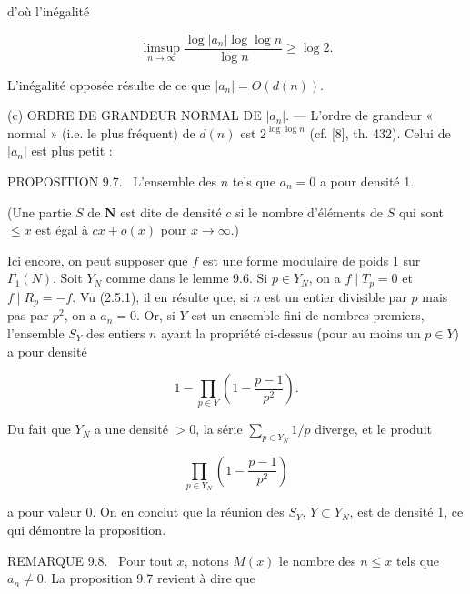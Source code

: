 \documentclass[10pt,oneside]{article}
\begin{document}
d'où l'inégalité\par

\begin{equation*}
\limsup_{n\to\infty}\frac{\log|a_n|\log\log n}{\log n}\geq\log2.
\end{equation*}

L'inégalité opposée résulte de ce que \(|a_n|=O(d(n))\).\par

(c) ORDRE DE GRANDEUR NORMAL DE \(|a_n|\). — L'ordre de grandeur « normal » (i.e. le plus fréquent) de \(d(n)\) est \(2^{\log\log n}\) (cf. [8], th. 432). Celui de \(|a_n|\) est plus petit :\par

\noindent\textsc{PROPOSITION 9.7.} \textemdash\ L'ensemble des \(n\) tels que \(a_n=0\) a pour densité 1.\par

(Une partie \(S\) de \(\mathbf N\) est dite de densité \(c\) si le nombre d'éléments de \(S\) qui sont \(\leq x\) est égal à \(cx+o(x)\) pour \(x\longrightarrow\infty\).)\par

Ici encore, on peut supposer que \(f\) est une forme modulaire de poids 1 sur \(\Gamma_1(N)\). Soit \(Y_N\) comme dans le lemme 9.6. Si \(p\in Y_N\), on a \(f\mid T_p=0\) et \(f\mid R_p=-f\). Vu (2.5.1), il en résulte que, si \(n\) est un entier divisible par \(p\) mais pas par \(p^2\), on a \(a_n=0\). Or, si \(Y\) est un ensemble fini de nombres premiers, l'ensemble \(S_Y\) des entiers \(n\) ayant la propriété ci-dessus (pour au moins un \(p\in Y\)) a pour densité\par

\begin{equation*}
1-\prod_{p\in Y}\left(1-\frac{p-1}{p^2}\right).
\end{equation*}

Du fait que \(Y_N\) a une densité \(>0\), la série \(\sum_{p\in Y_N}1/p\) diverge, et le produit\par

\begin{equation*}
\prod_{p\in Y_N}\left(1-\frac{p-1}{p^2}\right)
\end{equation*}

a pour valeur 0. On en conclut que la réunion des \(S_Y\), \(Y\subset Y_N\), est de densité 1, ce qui démontre la proposition.\par

\noindent\textsc{REMARQUE 9.8.} \textemdash\ Pour tout \(x\), notons \(M(x)\) le nombre des \(n\leq x\) tels que \(a_n\ne0\). La proposition 9.7 revient à dire que\par
\end{document}
